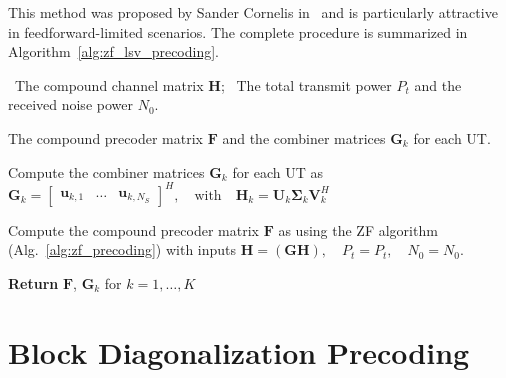 This method was proposed by Sander Cornelis in~\cite{cornelis_2025} and is particularly attractive in feedforward-limited scenarios.
The complete procedure is summarized in Algorithm~\ref{alg:zf_lsv_precoding}.
\begin{algorithm}[!htbp]
\caption{\ac{ZF} Precoding with Heuristic \acs{LSV} combiner}
\label{alg:zf_lsv_precoding}
\begin{algorithmic}[1]
    
    \Require 
    \Statex \hspace{-\algorithmicindent} \textbullet \, The compound channel matrix $\mathbf{H}$;
    \Statex \hspace{-\algorithmicindent} \textbullet \, The total transmit power $P_t$ and the received noise power $N_0$.
    
    \Ensure  The compound precoder matrix $\mathbf{F}$ and the combiner matrices $\mathbf{G}_k$ for each \ac{UT}.

    \medskip
    \State Compute the combiner matrices $\mathbf{G}_k$ for each \ac{UT} as
    \Statex $\mathbf{G}_k = \begin{bmatrix} \mathbf{u}_{k, 1} & \dots & \mathbf{u}_{k, N_S} \end{bmatrix}^H, \quad \text{with} \quad \mathbf{H}_k = \mathbf{U}_k \mathbf{\Sigma}_k \mathbf{V}^H_k$

    \vspace{0.4\baselineskip}
    \State Compute the compound precoder matrix $\mathbf{F}$ as using the \ac{ZF} algorithm (Alg.~\ref{alg:zf_precoding}) with inputs
    \Statex $\mathbf{H} = (\mathbf{G}\mathbf{H}), \quad P_t = P_t, \quad N_0 = N_0.$
    
    \medskip
    \Statex \hspace{-\algorithmicindent}\textbf{Return} \; $\mathbf{F}$, \; $\mathbf{G}_k$ for $k=1, \dots, K$

\end{algorithmic}
\end{algorithm}




\section{Block Diagonalization Precoding}
\label{section:mu_mimo_bd_precoding}


